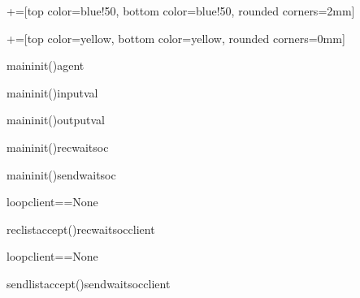 \begin{sequencediagram}[.6]
	+=[top color=blue!50, bottom color=blue!50, rounded corners=2mm]
	
	+=[top color=yellow, bottom color=yellow, rounded corners=0mm] 
	
	
	\begin{messcall}{main}{init()}{agent}{}		
	\end{messcall}		
	\begin{messcall}{main}{init()}{inputval}
	\end{messcall}	
	\begin{messcall}{main}{init()}{outputval}{}		
	\end{messcall}
	\begin{messcall}{main}{init()}{recwaitsoc}{}		
	\end{messcall}		
	\begin{messcall}{main}{init()}{sendwaitsoc}{}		
	\end{messcall}		
	\begin{sdblock}{loop}{client==None}
		\begin{call}[2]{reclist}{accept()}{recwaitsoc}{client}
		\end{call}
	\end{sdblock}
	\prelevel\prelevel\prelevel\prelevel
	
	\prelevel\prelevel\prelevel\prelevel
	\begin{sdblock}{loop}{client==None}
		\begin{call}[2]{sendlist}{accept()}{sendwaitsoc}{client}
		\end{call}
	\end{sdblock}
	\prelevel\prelevel\prelevel\prelevel
	\postlevel\postlevel
	

\end{sequencediagram}
